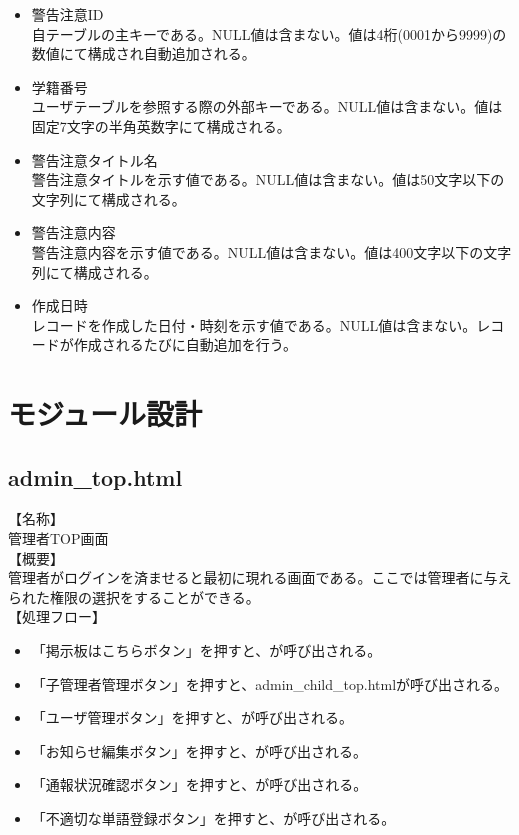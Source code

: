 \documentclass[a4j]{jarticle}
\begin{document}
  \begin{itemize}
  \item 警告注意ID\\
    自テーブルの主キーである。NULL値は含まない。値は4桁(0001から9999)の数値にて構成され自動追加される。
  \item 学籍番号\\
    ユーザテーブルを参照する際の外部キーである。NULL値は含まない。値は固定7文字の半角英数字にて構成される。\\
    
  \item 警告注意タイトル名\\
    警告注意タイトルを示す値である。NULL値は含まない。値は50文字以下の文字列にて構成される。
  \item 警告注意内容\\
    警告注意内容を示す値である。NULL値は含まない。値は400文字以下の文字列にて構成される。\\
    
  \item 作成日時\\
    レコードを作成した日付・時刻を示す値である。NULL値は含まない。レコードが作成されるたびに自動追加を行う。
  \end{itemize}



\section{モジュール設計}
\subsection{admin\_top.html}
\noindent
【名称】\\
管理者TOP画面\\
【概要】\\
管理者がログインを済ませると最初に現れる画面である。ここでは管理者に与えられた権限の選択をすることができる。\\
【処理フロー】
\begin{itemize}
\item 「掲示板はこちらボタン」を押すと、が呼び出される。
\item 「子管理者管理ボタン」を押すと、admin\_child\_top.htmlが呼び出される。
\item 「ユーザ管理ボタン」を押すと、が呼び出される。
\item 「お知らせ編集ボタン」を押すと、が呼び出される。
\item 「通報状況確認ボタン」を押すと、が呼び出される。
\item 「不適切な単語登録ボタン」を押すと、が呼び出される。
\end{itemize}
\end{document}
